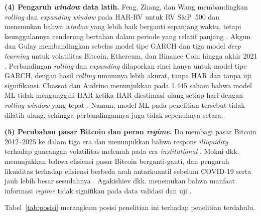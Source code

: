 \textbf{(4) Pengaruh \textit{window} data latih.} Feng, Zhang, dan Wang
membandingkan \textit{rolling} dan \textit{expanding window} pada HAR-RV untuk
RV S\&P~500 dan menemukan bahwa \textit{window} yang lebih baik berganti
sepanjang waktu, tetapi keunggulannya cenderung bertahan dalam periode yang
relatif panjang \cite{feng2024window}. Akgun dan Gulay membandingkan sebelas
model tipe GARCH dan tiga model \textit{deep learning} untuk volatilitas
Bitcoin, Ethereum, dan Binance Coin hingga akhir 2021 \cite{akgun2025}.
Perbandingan \textit{rolling} dan \textit{expanding} dilaporkan rinci hanya
untuk model tipe GARCH, dengan hasil \textit{rolling} umumnya lebih akurat,
tanpa HAR dan tanpa uji signifikansi. Chassot dan Audrino menunjukkan pada
1.445 saham bahwa model ML tidak mengungguli HAR ketika HAR diestimasi ulang
setiap hari dengan \textit{rolling window} yang tepat \cite{chassot2026}.
Namun, model ML pada penelitian tersebut tidak dilatih ulang, sehingga
perbandingannya juga tidak sepenuhnya setara.

\textbf{(5) Perubahan pasar Bitcoin dan peran \textit{regime}.} Do membagi pasar
Bitcoin 2012--2025 ke dalam tiga era dan menunjukkan bahwa respons
\textit{illiquidity} terhadap guncangan volatilitas melemah pada era
\textit{institutional} \cite{do2026}. Mokni dkk. menunjukkan bahwa efisiensi
pasar Bitcoin berganti-ganti, dan pengaruh likuiditas terhadap efisiensi
berbeda arah antarkuantil sebelum COVID-19 serta jauh lebih besar sesudahnya
\cite{mokni2024}. Agakishiev dkk.
menemukan bahwa manfaat informasi \textit{regime} tidak signifikan pada data
validasi dan uji \cite{agakishiev2025}.

Tabel~\ref{tab:posisi} merangkum posisi penelitian ini terhadap penelitian
terdahulu.

